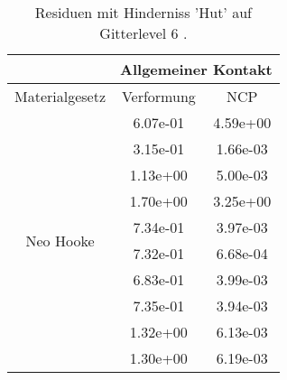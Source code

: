 \begin{table} 
\centering 
\begin{tabular}{c|cc|} 
\cline{2-3} 
 & \multicolumn{2}{|c|}{Allgemeiner Kontakt} \\ 
\hline 
\multicolumn{1}{|c|}{Materialgesetz} & \multicolumn{1}{c|}{Verformung} & \multicolumn{1}{c|}{NCP} \\ 
\hline 
\multicolumn{1}{|c|}{\multirow{10}{*}{Neo Hooke}} &\multicolumn{1}{|c|}{  6.07e-01} & \multicolumn{1}{|c|}{  4.59e+00} \\ 
\multicolumn{1}{|c|}{} & \multicolumn{1}{|c|}{  3.15e-01} & \multicolumn{1}{|c|}{  1.66e-03} \\ 
\multicolumn{1}{|c|}{} & \multicolumn{1}{|c|}{  1.13e+00} & \multicolumn{1}{|c|}{  5.00e-03} \\ 
\multicolumn{1}{|c|}{} & \multicolumn{1}{|c|}{  1.70e+00} & \multicolumn{1}{|c|}{  3.25e+00} \\ 
\multicolumn{1}{|c|}{} & \multicolumn{1}{|c|}{  7.34e-01} & \multicolumn{1}{|c|}{  3.97e-03} \\ 
\multicolumn{1}{|c|}{} & \multicolumn{1}{|c|}{  7.32e-01} & \multicolumn{1}{|c|}{  6.68e-04} \\ 
\multicolumn{1}{|c|}{} & \multicolumn{1}{|c|}{  6.83e-01} & \multicolumn{1}{|c|}{  3.99e-03} \\ 
\multicolumn{1}{|c|}{} & \multicolumn{1}{|c|}{  7.35e-01} & \multicolumn{1}{|c|}{  3.94e-03} \\ 
\multicolumn{1}{|c|}{} & \multicolumn{1}{|c|}{  1.32e+00} & \multicolumn{1}{|c|}{  6.13e-03} \\ 
\multicolumn{1}{|c|}{} & \multicolumn{1}{|c|}{  1.30e+00} & \multicolumn{1}{|c|}{  6.19e-03} \\ 
\hline 
\end{tabular}\caption{Residuen mit Hinderniss 'Hut' auf Gitterlevel 6 .}\label{tab:Residuum_Hut_level6}
\end{table} 
